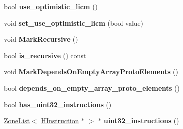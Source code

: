 \begin{DoxyCompactItemize}
\item 
\hypertarget{classv8_1_1internal_1_1_v8___f_i_n_a_l_a98b348b53878adca230b59ea948f9da3}{}bool {\bfseries use\+\_\+optimistic\+\_\+licm} ()\label{classv8_1_1internal_1_1_v8___f_i_n_a_l_a98b348b53878adca230b59ea948f9da3}

\item 
\hypertarget{classv8_1_1internal_1_1_v8___f_i_n_a_l_aecc6d54f5ad8c4c498173b7a5d2b1226}{}void {\bfseries set\+\_\+use\+\_\+optimistic\+\_\+licm} (bool value)\label{classv8_1_1internal_1_1_v8___f_i_n_a_l_aecc6d54f5ad8c4c498173b7a5d2b1226}

\item 
\hypertarget{classv8_1_1internal_1_1_v8___f_i_n_a_l_ae6c445293078c122556d27304eb97758}{}void {\bfseries Mark\+Recursive} ()\label{classv8_1_1internal_1_1_v8___f_i_n_a_l_ae6c445293078c122556d27304eb97758}

\item 
\hypertarget{classv8_1_1internal_1_1_v8___f_i_n_a_l_a76cd3eb4da8dc4586b412170cd3982fc}{}bool {\bfseries is\+\_\+recursive} () const \label{classv8_1_1internal_1_1_v8___f_i_n_a_l_a76cd3eb4da8dc4586b412170cd3982fc}

\item 
\hypertarget{classv8_1_1internal_1_1_v8___f_i_n_a_l_a49ec8326b9e8c98258b708c053fc1ab9}{}void {\bfseries Mark\+Depends\+On\+Empty\+Array\+Proto\+Elements} ()\label{classv8_1_1internal_1_1_v8___f_i_n_a_l_a49ec8326b9e8c98258b708c053fc1ab9}

\item 
\hypertarget{classv8_1_1internal_1_1_v8___f_i_n_a_l_ad8333bd9dbd3fc2872564273c7472400}{}bool {\bfseries depends\+\_\+on\+\_\+empty\+\_\+array\+\_\+proto\+\_\+elements} ()\label{classv8_1_1internal_1_1_v8___f_i_n_a_l_ad8333bd9dbd3fc2872564273c7472400}

\item 
\hypertarget{classv8_1_1internal_1_1_v8___f_i_n_a_l_a6c591d295c41e6772ec5a85e9012d91d}{}bool {\bfseries has\+\_\+uint32\+\_\+instructions} ()\label{classv8_1_1internal_1_1_v8___f_i_n_a_l_a6c591d295c41e6772ec5a85e9012d91d}

\item 
\hypertarget{classv8_1_1internal_1_1_v8___f_i_n_a_l_a8ed042effe81de979b287494bd53db7c}{}\hyperlink{classv8_1_1internal_1_1_zone_list}{Zone\+List}$<$ \hyperlink{classv8_1_1internal_1_1_h_instruction}{H\+Instruction} $\ast$ $>$ $\ast$ {\bfseries uint32\+\_\+instructions} ()\label{classv8_1_1internal_1_1_v8___f_i_n_a_l_a8ed042effe81de979b287494bd53db7c}


\end{DoxyCompactItemize}
